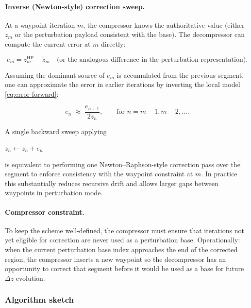 \paragraph{Inverse (Newton-style) correction sweep.}
At a waypoint iteration \(m\), the compressor knows the authoritative value
(either \(z_m\) or the perturbation payload consistent with the base).  The
decompressor can compute the current error at \(m\) directly:

\begin{equation}
  e_m = z_m^{\mathrm{HP}} - \tilde z_m
  \quad\text{(or the analogous difference in the perturbation representation).}
  \label{eq:waypoint-error}
\end{equation}

Assuming the dominant source of \(e_m\) is accumulated from the previous segment,
one can approximate the error in earlier iterations by inverting the local model
\eqref{eq:error-forward}:

\begin{equation}
  e_n \;\approx\; \frac{e_{n+1}}{2\tilde z_n},
  \qquad \text{for } n=m-1,m-2,\dots.
  \label{eq:error-backward}
\end{equation}

A single backward sweep applying

\(
\tilde z_n \leftarrow \tilde z_n + e_n
\)

is equivalent to performing one Newton--Raphson-style correction pass over the
segment to enforce consistency with the waypoint constraint at \(m\).  In
practice this substantially reduces recursive drift and allows larger gaps
between waypoints in perturbation mode.

\paragraph{Compressor constraint.}
To keep the scheme well-defined, the compressor must ensure that iterations not
yet eligible for correction are never used as a perturbation base.  Operationally:
when the current perturbation base index approaches the end of the corrected
region, the compressor inserts a new waypoint so the decompressor has an
opportunity to correct that segment before it would be used as a base for future
\(\Delta z\) evolution.

\subsubsection{Algorithm sketch}

